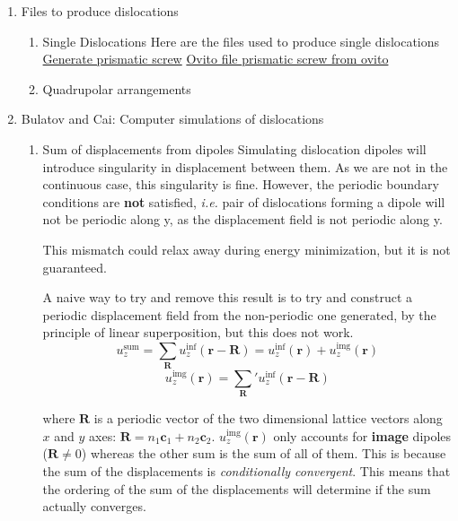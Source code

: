 \documentclass[11pt]{article}
\begin{document}
\begin{enumerate}
\item Files to produce dislocations
\label{sec:org1234ec5}
\begin{enumerate}
\item Single Dislocations
\label{sec:orge777038}
Here are the files used to produce single dislocations
\href{file:///home/tigany/Documents/disl\_gsurf/useful\_python/bop/dislocations/create\_dislocations/gen\_prismatic\_screw\_tbe.py}{Generate prismatic screw} \href{file:///home/tigany/Documents/disl\_gsurf/useful\_python/bop/dislocations/create\_dislocations/test/generated\_dislocations/site.ti\_9x\_9y\_8z\_square\_1\_dislanis\_prim\_rot\_convert.xyz}{Ovito file }
\href{file:///home/tigany/Pictures/prismatic\_screw\_tbe\_full\_anis.png}{prismatic screw from ovito }
\item Quadrupolar arrangements
\label{sec:org7cf4eaf}
\end{enumerate}

\item Bulatov and Cai: Computer simulations of dislocations
\label{sec:orgb8fd040}

\begin{enumerate}
\item Sum of displacements from dipoles
\label{sec:org358e26e}
Simulating dislocation dipoles will introduce singularity in displacement
between them. As we are not in the continuous case, this singularity is
fine. However, the periodic boundary conditions are \textbf{not} satisfied,
\emph{i.e.} pair of dislocations forming a dipole will not be periodic
along y, as the displacement field is not periodic along y. 

This mismatch could relax away during energy minimization, but it is not
guaranteed. 

A naive way to try and remove this result is to try and construct a
periodic displacement field from the non-periodic one generated, by the
principle of linear superposition, but this does not work. 
\[ u_{z}^{\text{sum}} = \sum_{\mathbf{R}} u_{z}^{\inf}(\mathbf{r}
     -\mathbf{R}) = u_{z}^{\inf}(\mathbf{r}) + u_{z}^{\text{img}}(\mathbf{r})
     \]
\[  u_{z}^{\text{img}}(\mathbf{r}) = \sum_{\mathbf{R}}' u_{z}^{\inf}(\mathbf{r}
     -\mathbf{R}) \]

where \(\mathbf{R}\) is a periodic vector of the two dimensional lattice
vectors along \(x\) and \(y\) axes: \(\mathbf{R} = n_{1}\mathbf{c}_1 +
     n_{2}\mathbf{c}_2\).
\(u_{z}^{\text{img}}(\mathbf{r})\) only accounts for \textbf{image} dipoles
(\(\mathbf{R}\neq 0\))
whereas the other sum is the sum of all of them. 
This is because the sum of the displacements is \emph{conditionally
convergent}. This means that the ordering of the sum of the displacements
will determine if the sum actually converges.


\end{enumerate}
\end{enumerate}
\end{document}

